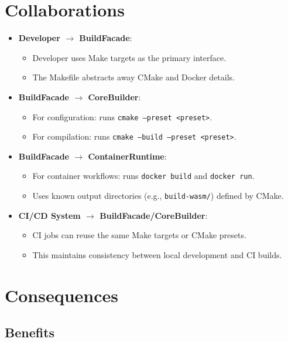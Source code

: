\documentclass[11pt]{article}
\begin{document}
\section{Collaborations}

\begin{itemize}[noitemsep]
  \item \textbf{Developer $\rightarrow$ BuildFacade}:
    \begin{itemize}[noitemsep]
      \item Developer uses Make targets as the primary interface.
      \item The Makefile abstracts away CMake and Docker details.
    \end{itemize}

  \item \textbf{BuildFacade $\rightarrow$ CoreBuilder}:
    \begin{itemize}[noitemsep]
      \item For configuration: runs \texttt{cmake --preset <preset>}.
      \item For compilation: runs \texttt{cmake --build --preset <preset>}.
    \end{itemize}

  \item \textbf{BuildFacade $\rightarrow$ ContainerRuntime}:
    \begin{itemize}[noitemsep]
      \item For container workflows: runs \texttt{docker build} and \texttt{docker run}.
      \item Uses known output directories (e.g., \texttt{build-wasm/}) defined by CMake.
    \end{itemize}

  \item \textbf{CI/CD System $\rightarrow$ BuildFacade/CoreBuilder}:
    \begin{itemize}[noitemsep]
      \item CI jobs can reuse the same Make targets or CMake presets.
      \item This maintains consistency between local development and CI builds.
    \end{itemize}
\end{itemize}

\section{Consequences}

\subsection*{Benefits}
\end{document}
